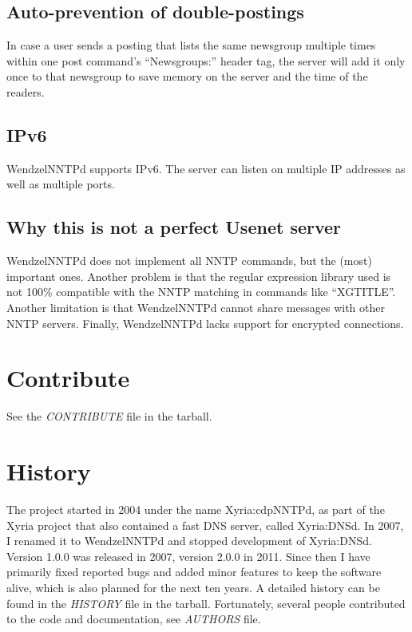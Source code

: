 \subsection{Auto-prevention of double-postings}

In case a user sends a posting that lists the same newsgroup multiple times within one post command's ``Newsgroups:'' header tag, the server will add it only once to that newsgroup to save memory on the server and the time of the readers.

\subsection{IPv6}

WendzelNNTPd supports IPv6. The server can listen on multiple IP addresses as well as multiple ports.

\subsection{Why this is not a perfect Usenet server}

WendzelNNTPd does not implement all NNTP commands, but the (most) important ones. Another problem is that the regular expression library used is not 100\% compatible with the NNTP matching in commands like ``XGTITLE''. Another limitation is that WendzelNNTPd cannot share messages with other NNTP servers. 
%
Finally, WendzelNNTPd lacks support for encrypted connections.

\section{Contribute}

See the \emph{CONTRIBUTE} file in the tarball.

\section{History}

The project started in 2004 under the name Xyria:cdpNNTPd, as part of the Xyria project that also contained a fast DNS server, called Xyria:DNSd. In 2007, I renamed it to WendzelNNTPd and stopped development of Xyria:DNSd. Version 1.0.0 was released in 2007, version 2.0.0 in 2011. Since then I have primarily fixed reported bugs and added minor features to keep the software alive, which is also planned for the next ten years. A detailed history can be found in the \emph{HISTORY} file in the tarball. Fortunately, several people contributed to the code and documentation, see \emph{AUTHORS} file.


